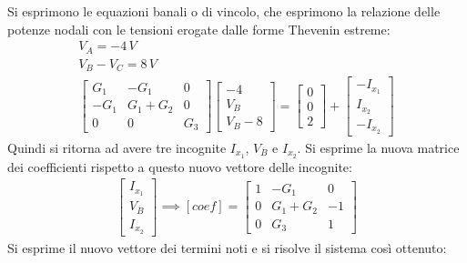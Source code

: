 \documentclass{article}
\numberwithin{equation}{subsection}
\begin{document}
Si esprimono le equazioni banali o di vincolo, che esprimono la relazione delle potenze nodali con le tensioni erogate dalle forme Thevenin estreme: 
\begin{gather*}
    V_A=-4\,V\\
    V_B-V_C=8\,V\\
    \begin{bmatrix}
        G_1&-G_1&0\\-G_1&G_1+G_2&0\\0&0&G_3
    \end{bmatrix}\begin{bmatrix}
        -4\\V_B\\V_B-8
    \end{bmatrix}=\begin{bmatrix}
        0\\0\\2
    \end{bmatrix}+\begin{bmatrix}
        -I_{x_1}\\I_{x_2}\\-I_{x_2}
    \end{bmatrix}
\end{gather*}
Quindi si ritorna ad avere tre incognite $I_{x_1}$, $V_B$ e $I_{x_2}$. Si esprime la nuova matrice dei coefficienti rispetto a questo nuovo vettore delle incognite:
\begin{gather*}
    \begin{bmatrix}
        I_{x_1}\\V_B\\I_{x_2}
    \end{bmatrix}\implies\left[coef\right]=\begin{bmatrix}
        1&-G_1&0\\0&G_1+G_2&-1\\0&G_3&1
    \end{bmatrix}
\end{gather*}
Si esprime il nuovo vettore dei termini noti e si risolve il sistema così ottenuto:
\end{document}
